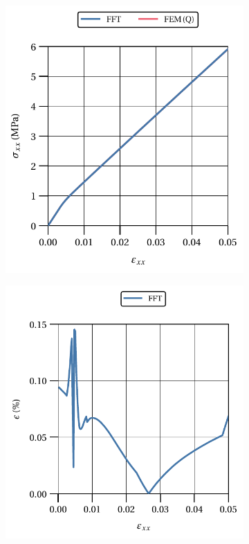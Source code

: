 \begin{figure}[hbt]
  \centering
  	\begin{subfigure}[b]{0.49\textwidth}
      \centering
      \includegraphics[width=\textwidth]{figures/von_mises_res_mat_small_strain_2D_normal_material_response}
      \caption{}
      \label{subfig:von_mises_res_mat_small_strain_2D_normal_material_response}
    \end{subfigure}
    \begin{subfigure}[b]{0.49\textwidth}
      \centering
      \includegraphics[width=\textwidth]{figures/von_mises_res_mat_small_strain_2D_normal_material_response_error}

\end{subfigure}
\end{figure}
